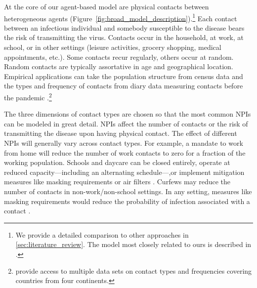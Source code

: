 At the core of our agent-based model are physical contacts between heterogeneous agents
(Figure~\ref{fig:broad_model_description}).\footnote{We provide a detailed comparison to
    other approaches in \ref{sec:literature_review}. The model most closely related to ours
    is described in \citet{Hinch2020}.} Each contact between an infectious individual and
somebody susceptible to the disease bears the risk of transmitting the virus. Contacts
occur in the household, at work, at school, or in other settings (leisure activities,
grocery shopping, medical appointments, etc.). Some contacts recur regularly, others
occur at random. Random contacts are typically assortative in age and geographical
location. Empirical applications can take the population structure from census data and
the types and frequency of contacts from diary data measuring contacts before the
pandemic \citep[e.g.][]{Mossong2008}.\footnote{\citet{Hoang2019} provide access to
    multiple data sets on contact types and frequencies covering countries from four
    continents.}

The three dimensions of contact types are chosen so that the most common NPIs can be
modeled in great detail. NPIs affect the number of contacts or the risk of transmitting
the disease upon having physical contact. The effect of different NPIs will generally
vary across contact types. For example, a mandate to work from home will reduce the
number of work contacts to zero for a fraction of the working population. Schools and
daycare can be closed entirely, operate at reduced capacity---including an alternating
schedule---,or implement mitigation measures like masking requirements or air filters
\citep{Lessler2021}. Curfews may reduce the number of contacts in non-work/non-school
settings. In any setting, measures like masking requirements would reduce the
probability of infection associated with a contact
\citep{Cheng2021}.

